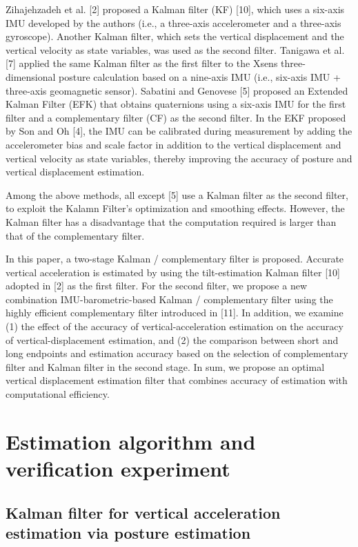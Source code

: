 \documentclass[10pt,journal,compsoc]{IEEEtran}
\begin{document}
Zihajehzadeh et al. [2] proposed a Kalman filter (KF) [10], which uses a six-axis
IMU developed by the authors (i.e., a three-axis accelerometer and a three-axis
gyroscope). Another Kalman filter, which sets the vertical displacement and
the vertical velocity as state variables, was used as the second filter.
Tanigawa et al. [7] applied the same Kalman filter as the first filter to the
Xsens three-dimensional posture calculation based on a nine-axis IMU (i.e., six-axis
IMU + three-axis geomagnetic sensor). Sabatini and Genovese [5]
proposed an Extended Kalman Filter (EFK) that obtains quaternions
using a six-axis IMU for the first filter and a complementary filter (CF) as the second
filter. In the EKF proposed by Son and Oh [4], the IMU can be calibrated during
measurement by adding the accelerometer bias and scale factor in addition
to the vertical displacement and vertical velocity as state variables, thereby
improving the accuracy of posture and vertical displacement estimation.

Among the above methods, all except [5] use a Kalman filter as the second filter,
to exploit the Kalamn Filter's optimization and smoothing effects.  However,
the Kalman filter has a disadvantage that the computation required is larger than
that of the complementary filter.

In this paper, a two-stage Kalman / complementary filter is proposed.  Accurate
vertical acceleration is estimated by using the tilt-estimation Kalman filter
[10] adopted in [2] as the first filter. For the second filter, we propose a new
combination IMU-barometric-based Kalman / complementary filter using the
highly efficient complementary filter introduced in [11].  In addition, we
examine (1) the effect of the accuracy of vertical-acceleration estimation on
the accuracy of vertical-displacement estimation, and (2) the comparison
between short and long endpoints and estimation accuracy based on the selection of
complementary filter and Kalman filter in the second stage. In sum,
we propose an optimal vertical displacement estimation filter that combines 
accuracy of estimation with computational efficiency.

\section{Estimation algorithm and verification experiment}

\subsection{Kalman filter for vertical acceleration estimation via posture estimation}
\end{document}

